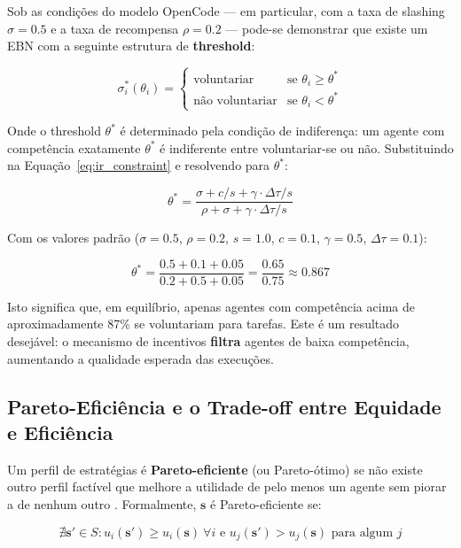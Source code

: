 Sob as condições do modelo OpenCode --- em particular, com a taxa de slashing $\sigma = 0.5$ e a taxa de recompensa $\rho = 0.2$ --- pode-se demonstrar que existe um EBN com a seguinte estrutura de \textbf{threshold}:

\begin{equation}\label{eq:threshold_strategy}
\sigma_i^*(\theta_i) = \begin{cases}
\text{voluntariar} & \text{se } \theta_i \geq \theta^* \\
\text{não voluntariar} & \text{se } \theta_i < \theta^*
\end{cases}
\end{equation}

Onde o threshold $\theta^*$ é determinado pela condição de indiferença: um agente com competência exatamente $\theta^*$ é indiferente entre voluntariar-se ou não. Substituindo na Equação~\eqref{eq:ir_constraint} e resolvendo para $\theta^*$:

\begin{equation}\label{eq:threshold_value}
\theta^* = \frac{\sigma + c/s + \gamma \cdot \Delta\tau / s}{\rho + \sigma + \gamma \cdot \Delta\tau / s}
\end{equation}

Com os valores padrão ($\sigma = 0.5$, $\rho = 0.2$, $s = 1.0$, $c = 0.1$, $\gamma = 0.5$, $\Delta\tau = 0.1$):

\begin{equation}
\theta^* = \frac{0.5 + 0.1 + 0.05}{0.2 + 0.5 + 0.05} = \frac{0.65}{0.75} \approx 0.867
\end{equation}

Isto significa que, em equilíbrio, apenas agentes com competência acima de aproximadamente 87\% se voluntariam para tarefas. Este é um resultado desejável: o mecanismo de incentivos \textbf{filtra} agentes de baixa competência, aumentando a qualidade esperada das execuções.

\subsection{Pareto-Eficiência e o Trade-off entre Equidade e Eficiência}

Um perfil de estratégias é \textbf{Pareto-eficiente} (ou Pareto-ótimo) se não existe outro perfil factível que melhore a utilidade de pelo menos um agente sem piorar a de nenhum outro \cite{varian1992microeconomic}. Formalmente, $\mathbf{s}$ é Pareto-eficiente se:

\begin{equation}\label{eq:pareto}
\nexists \mathbf{s}' \in S : u_i(\mathbf{s}') \geq u_i(\mathbf{s}) \ \forall i \text{ e } u_j(\mathbf{s}') > u_j(\mathbf{s}) \text{ para algum } j
\end{equation}

